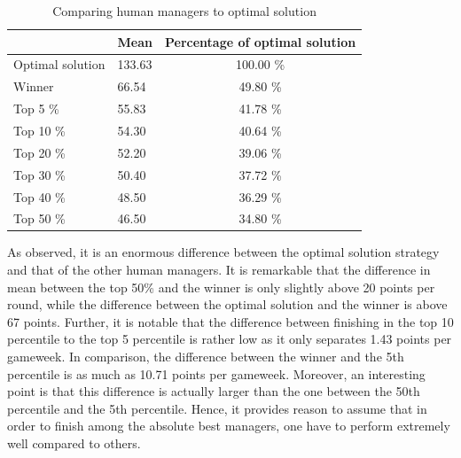 \begin{table}[H]
\centering
\caption{Comparing human managers to optimal solution}
\label{Optimal_Human}
\begin{tabular}{llc}
\hline
                 & Mean   & \multicolumn{1}{l}{Percentage of optimal solution} \\
\hline                 
Optimal solution & 133.63 & 100.00 \%                                          \\
Winner           & 66.54  & 49.80 \%                                           \\
Top 5 \%         & 55.83  & 41.78 \%                                           \\
Top 10 \%        & 54.30  & 40.64 \%                                           \\
Top 20 \%        & 52.20  & 39.06 \%                                           \\
Top 30 \%        & 50.40  & 37.72 \%                                           \\
Top 40 \%        & 48.50  & 36.29 \%                                           \\
Top 50 \%        & 46.50  & 34.80 \%                                           \\
\hline
\end{tabular}
\end{table}

As observed, it is an enormous difference between the optimal solution strategy and that of the other human managers. It is remarkable that the difference in mean between the top 50\% and the winner is only slightly above 20 points per round, while the difference between the optimal solution and the winner is above 67 points. Further, it is notable that the difference between finishing in the top 10 percentile to the top 5 percentile is rather low as it only separates 1.43 points per gameweek. In comparison, the difference between the winner and the 5th percentile is as much as 10.71 points per gameweek. Moreover, an interesting point is that this difference is actually larger than the one between the 50th percentile and the 5th percentile. Hence, it provides reason to assume that in order to finish among the absolute best managers, one have to perform extremely well compared to others. 
\newpar
 


